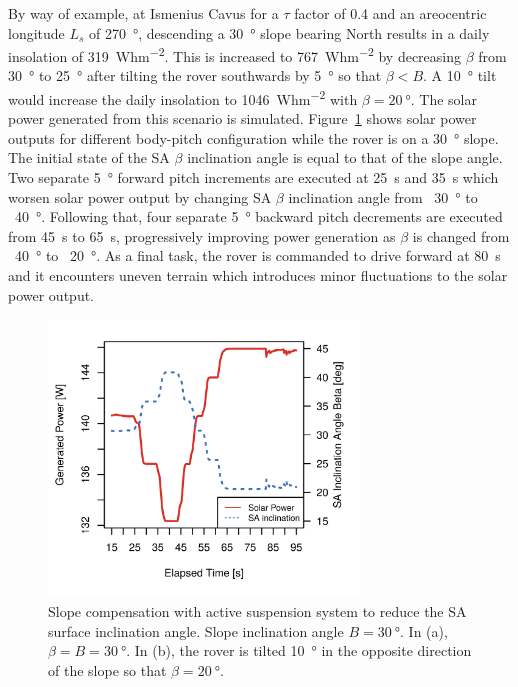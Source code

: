 \documentclass[twocolumn,letterpaper]{IEEEAerospaceCLS}  %
\newcommand{\refFig}[1]{{Figure}~\ref{#1}} %
\begin{document}
By way of example, at Ismenius Cavus for a $\tau$ factor of 0.4 and an areocentric longitude $L_{s}$ of \SI{270}{\degree}, descending a \SI{30}{\degree} slope bearing North results in a daily insolation of \SI{319}{Whm^{-2}}. This is increased to \SI{767}{Whm^{-2}} by decreasing $\beta$ from \SI{30}{\degree} to \SI{25}{\degree} after tilting the rover southwards by \SI{5}{\degree} so that $\beta < B$. A \SI{10}{\degree} tilt would increase the daily insolation to \SI{1046}{Whm^{-2}} with $\beta = \SI{20}{\degree}$. The solar power generated from this scenario is simulated. \refFig{fig:sub:rover-on-slope-beta} shows solar power outputs for different body-pitch configuration while the rover is on a \SI{30}{\degree} slope. The initial state of the \ac{SA} $\beta$ inclination angle is equal to that of the slope angle. Two separate \SI{5}{\degree} forward pitch increments are executed at \SI{25}{\second} and \SI{35}{\second} which worsen solar power output by changing \ac{SA} $\beta$ inclination angle from ~\SI{30}{\degree} to ~\SI{40}{\degree}. Following that, four separate \SI{5}{\degree} backward pitch decrements are executed from \SI{45}{\second} to \SI{65}{\second}, progressively improving power generation as $\beta$ is changed from ~\SI{40}{\degree} to ~\SI{20}{\degree}. As a final task, the rover is commanded to drive forward at \SI{80}{\second} and it encounters uneven terrain which introduces minor fluctuations to the solar power output.


\begin{figure}[h]
  \centering
  \includegraphics[width=3.25in]{figures/plots/slope-compensation.png}
  \caption{Slope compensation with active suspension system to reduce the \ac{SA} surface inclination angle. Slope inclination angle $B = \SI{30}{\degree}$. In (a), $\beta = B = \SI{30}{\degree}$. In (b), the rover is tilted \SI{10}{\degree} in the opposite direction of the slope so that $\beta = \SI{20}{\degree}$.}
  \label{fig:sub:rover-on-slope-beta}
\end{figure}
\end{document}

